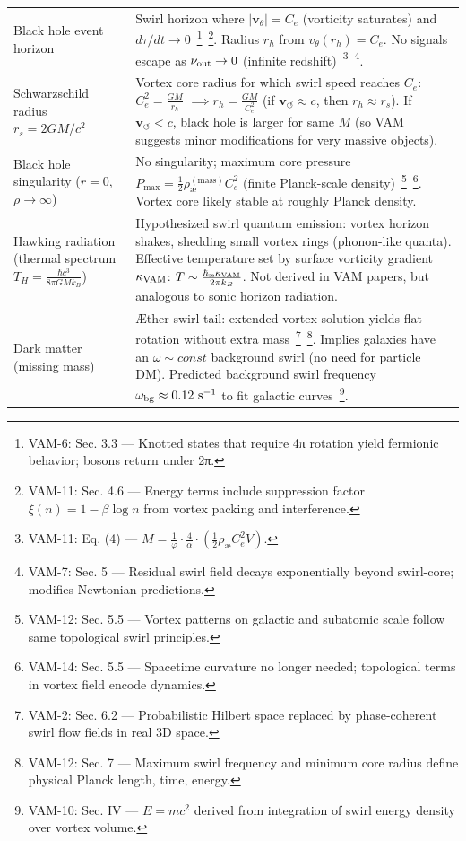 \documentclass[a4paper,12pt]{article}
\begin{document}
\begin{table}[H]
\begin{tabular}{p{} | p{}}
            Black hole event horizon & Swirl horizon where $|\mathbf{v}_\theta| = C_e$ (vorticity saturates) and $d\tau/dt \to 0$~\footnote{VAM-6: Sec. 3.3 — Knotted states that require 4π rotation yield fermionic behavior; bosons return under 2π.}~\footnote{VAM-11: Sec. 4.6 — Energy terms include suppression factor $\xi(n) = 1 - \beta \log n$ from vortex packing and interference.}. Radius $r_h$ from $v_\theta(r_h)=C_e$. No signals escape as $\nu_{\rm out}\to 0$ (infinite redshift)~\footnote{VAM-11: Eq. (4) — $M = \frac{1}{\varphi} \cdot \frac{4}{\alpha} \cdot \left( \frac{1}{2} \rho_{\text{\ae}} C_e^2 V \right)$.}~\footnote{VAM-7: Sec. 5 — Residual swirl field decays exponentially beyond swirl-core; modifies Newtonian predictions.}. \\
            Schwarzschild radius $r_s = 2GM/c^2$ & Vortex core radius for which swirl speed reaches $C_e$: $C_e^2 = \frac{GM}{r_h}$ $\implies r_h = \frac{GM}{C_e^2}$ (if $\mathbf{v}_{\scriptscriptstyle\boldsymbol{\circlearrowleft}} \approx c$, then $r_h \approx r_s$). If $\mathbf{v}_{\scriptscriptstyle\boldsymbol{\circlearrowleft}} < c$, black hole is larger for same $M$ (so VAM suggests minor modifications for very massive objects). \\
            Black hole singularity ($r=0$, $\rho\to\infty$) & No singularity; maximum core pressure $P_{\max} = \frac{1}{2}\rho_{\text{\ae}}^{(\text{mass})}C_e^2$ (finite Planck-scale density)~\footnote{VAM-12: Sec. 5.5 — Vortex patterns on galactic and subatomic scale follow same topological swirl principles.}~\footnote{VAM-14: Sec. 5.5 — Spacetime curvature no longer needed; topological terms in vortex field encode dynamics.}. Vortex core likely stable at roughly Planck density. \\
            Hawking radiation (thermal spectrum $T_H = \frac{\hbar c^3}{8\pi GMk_B}$) & Hypothesized swirl quantum emission: vortex horizon shakes, shedding small vortex rings (phonon-like quanta). Effective temperature set by surface vorticity gradient $\kappa_{\rm VAM}$: $T \sim \frac{\hbar_{\text{\ae}}\kappa_{\rm VAM}}{2\pi k_B}$. Not derived in VAM papers, but analogous to sonic horizon radiation. \\
            Dark matter (missing mass) & Æther swirl tail: extended vortex solution yields flat rotation without extra mass~\footnote{VAM-2: Sec. 6.2 — Probabilistic Hilbert space replaced by phase-coherent swirl flow fields in real 3D space.}~\footnote{VAM-12: Sec. 7 — Maximum swirl frequency and minimum core radius define physical Planck length, time, energy.}. Implies galaxies have an $\omega \sim const$ background swirl (no need for particle DM). Predicted background swirl frequency $\omega_{\rm bg}\approx 0.12~\text{s}^{-1}$ to fit galactic curves~\footnote{VAM-10: Sec. IV — $E = mc^2$ derived from integration of swirl energy density over vortex volume.}. \\

\end{tabular}
\end{table}
\end{document}
